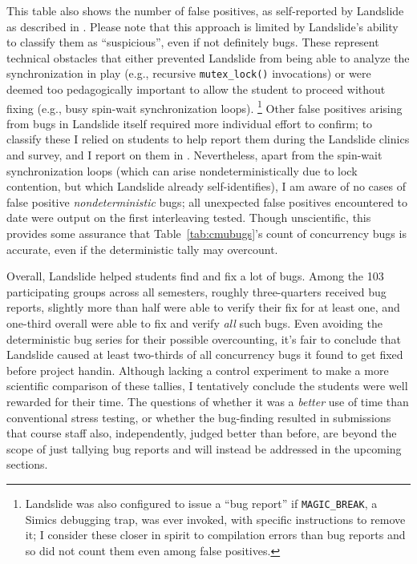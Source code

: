 This table also shows the number of false positives, as self-reported by Landslide
as described in \sect{\ref{sec:education-pebbles-instrumentation}}.
Please note that this approach %
is limited by Landslide's ability to classify them as ``suspicious'', even if not definitely bugs.
These represent technical obstacles that either
prevented Landslide from being able to analyze the synchronization in play
(e.g., recursive {\tt mutex\_lock()} invocations)
or were deemed too pedagogically important to allow the student to proceed without fixing
(e.g., busy spin-wait synchronization loops).%
\footnote{
Landslide was also configured to issue a ``bug report''
if {\tt MAGIC\_BREAK}, a Simics debugging trap, was ever invoked,
with specific instructions to remove it;
I consider these closer in spirit to compilation errors than bug reports and so did not count them
even among false positives.
}
Other false positives arising from bugs in Landslide itself
required more individual effort to confirm;
to classify these I relied on students to help report them
during the Landslide clinics and survey,
and I report on them in \sect{\ref{sec:education-eval-survey-falsepositives}}.
Nevertheless,
apart from the spin-wait synchronization loops
(which can arise nondeterministically due to lock contention, but which Landslide already self-identifies),
I am aware of no cases of false positive {\em nondeterministic} bugs;
all unexpected false positives encountered to date were output on the first interleaving tested.
Though unscientific,
this provides some assurance that Table~\ref{tab:cmubugs}'s count of concurrency bugs is accurate,
even if the deterministic tally may overcount.

Overall, Landslide helped students find and fix a lot of bugs.
Among the 103 participating groups across all semesters,
roughly three-quarters received bug reports,
slightly more than half were able to verify their fix for at least one,
and one-third overall were able to fix and verify {\em all} such bugs.
Even avoiding the deterministic bug series for their possible overcounting,
it's fair to conclude that Landslide caused at least two-thirds
of all concurrency bugs it found to get fixed before project handin.
Although lacking a control experiment to make a more scientific comparison of these tallies,
I tentatively conclude the students were well rewarded for their time.
The questions of whether it was a {\em better} use of time than conventional stress testing,
or whether the bug-finding resulted in submissions that course staff also, independently, judged better than before,
are beyond the scope of just tallying bug reports and will instead be addressed in the upcoming sections.

